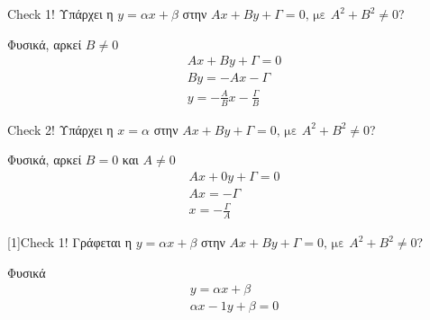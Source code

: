 \documentclass{../../presentation}
\begin{document}
\begin{frame}{Check 1!}
  Υπάρχει η $y=αx+β$ στην $Αx+Βy+Γ=0 \text{, με } Α^2+Β^2\ne 0$?

   Φυσικά, αρκεί $Β\ne 0$
  \begin{align*}
    Αx+Βy+Γ=0 \\
    Βy=-Αx-Γ  \\
    y=-\frac{Α}{Β}x-\frac{Γ}{Β}
  \end{align*}
\end{frame}

\begin{frame}{Check 2!}
  Υπάρχει η $x=α$ στην $Αx+Βy+Γ=0 \text{, με } Α^2+Β^2\ne 0$?

   Φυσικά, αρκεί $Β=0$ και $Α\ne 0$
  \begin{align*}
    Αx+0y+Γ=0 \\
    Αx=-Γ     \\
    x=-\frac{Γ}{Α}
  \end{align*}
\end{frame}

\begin{frame}{\scalebox{-1}[1]{Check 1!}}
  Γράφεται η $y=αx+β$ στην $Αx+Βy+Γ=0 \text{, με } Α^2+Β^2\ne 0$?

   Φυσικά
  \begin{align*}
    y=αx+β \\
    αx-1y+β=0
  \end{align*}
\end{frame}
\end{document}
